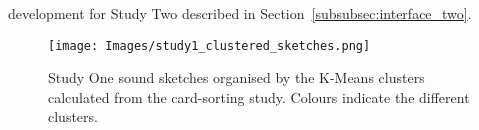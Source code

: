 \documentclass[]{interact}
\theoremstyle{plain}%
\theoremstyle{definition}
\theoremstyle{remark}
\begin{document}
development for Study Two described in Section~\ref{subsubsec:interface_two}. 

\begin{figure}[h]
\centering
\texttt{[image: Images/study1\_clustered\_sketches.png]}
\caption{Study One sound sketches organised by the K-Means clusters calculated from the card-sorting study. Colours indicate the different clusters.}\label{fig:study_one_categories}
\end{figure}

\begin{table*}[t]
 \begin{center}
 \begin{tabular}{|p{0.07\linewidth}|p{0.07\linewidth}||p{0.07\linewidth}|p{0.07\linewidth}||p{0.07\linewidth}|p{0.07\linewidth}||p{0.07\linewidth}|p{0.07\linewidth}||p{0.07\linewidth}|p{0.07\linewidth}|}
  

\end{tabular}
\end{center}
\end{table*}
\end{document}
